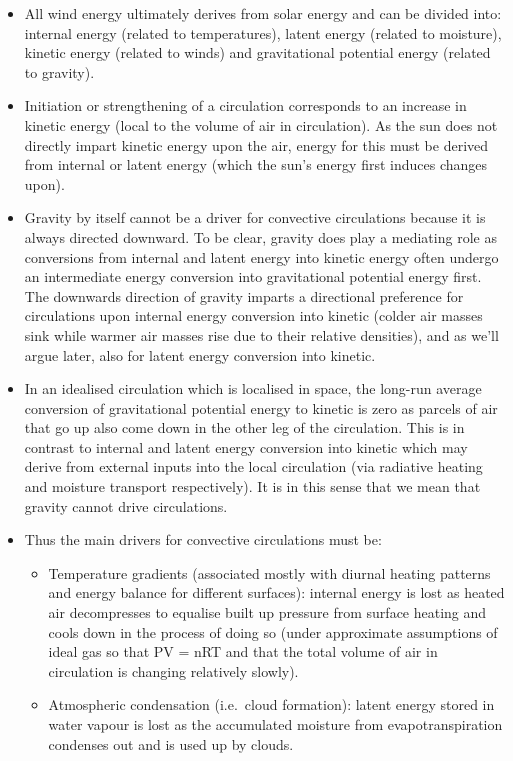\begin{itemize}
	\item All wind energy ultimately derives from solar energy and can be divided into: internal energy (related to temperatures), latent energy (related to moisture), kinetic energy (related to winds) and gravitational potential energy (related to gravity).
	\item Initiation or strengthening of a circulation corresponds to an increase in kinetic energy (local to the volume of air in circulation). As the sun does not directly impart kinetic energy upon the air, energy for this must be derived from internal or latent energy (which the sun’s energy first induces changes upon).
	\item Gravity by itself cannot be a driver for convective circulations because it is always directed downward. To be clear, gravity does play a mediating role as conversions from internal and latent energy into kinetic energy often undergo an intermediate energy conversion into gravitational potential energy first. The downwards direction of gravity imparts a directional preference for circulations upon internal energy conversion into kinetic (colder air masses sink while warmer air masses rise due to their relative densities), and as we’ll argue later, also for latent energy conversion into kinetic.
	\item In an idealised circulation which is localised in space, the long-run average conversion of gravitational potential energy to kinetic is zero as parcels of air that go up also come down in the other leg of the circulation. This is in contrast to internal and latent energy conversion into kinetic which may derive from external inputs into the local circulation (via radiative heating and moisture transport respectively). It is in this sense that we mean that gravity cannot drive circulations.
	\item Thus the main drivers for convective circulations must be:
	\begin{itemize}
		\item Temperature gradients (associated mostly with diurnal heating patterns and energy balance for different surfaces): internal energy is lost as heated air decompresses to equalise built up pressure from surface heating and cools down in the process of doing so (under approximate assumptions of ideal gas so that PV = nRT and that the total volume of air in circulation is changing relatively slowly).
		\item Atmospheric condensation (i.e.\ cloud formation): latent energy stored in water vapour is lost as the accumulated moisture from evapotranspiration condenses out and is used up by clouds.

\end{itemize}
\end{itemize}
